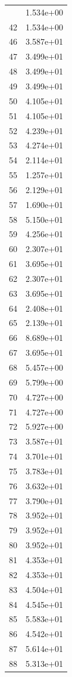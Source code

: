 \documentclass[12pt]{article}
\begin{document}
\begin{longtable}{@{}cc@{}}
\bottomrule
\endlastfoot
12 & 1.534e+00 \\
42 & 1.534e+00 \\
46 & 3.587e+01 \\
47 & 3.499e+01 \\
48 & 3.499e+01 \\
49 & 3.499e+01 \\
50 & 4.105e+01 \\
51 & 4.105e+01 \\
52 & 4.239e+01 \\
53 & 4.274e+01 \\
54 & 2.114e+01 \\
55 & 1.257e+01 \\
56 & 2.129e+01 \\
57 & 1.690e+01 \\
58 & 5.150e+01 \\
59 & 4.256e+01 \\
60 & 2.307e+01 \\
61 & 3.695e+01 \\
62 & 2.307e+01 \\
63 & 3.695e+01 \\
64 & 2.408e+01 \\
65 & 2.139e+01 \\
66 & 8.689e+01 \\
67 & 3.695e+01 \\
68 & 5.457e+00 \\
69 & 5.799e+00 \\
70 & 4.727e+00 \\
71 & 4.727e+00 \\
72 & 5.927e+00 \\
73 & 3.587e+01 \\
74 & 3.701e+01 \\
75 & 3.783e+01 \\
76 & 3.632e+01 \\
77 & 3.790e+01 \\
78 & 3.952e+01 \\
79 & 3.952e+01 \\
80 & 3.952e+01 \\
81 & 4.353e+01 \\
82 & 4.353e+01 \\
83 & 4.504e+01 \\
84 & 4.545e+01 \\
85 & 5.583e+01 \\
86 & 4.542e+01 \\
87 & 5.614e+01 \\
88 & 5.313e+01 \\

\end{longtable}
\end{document}
